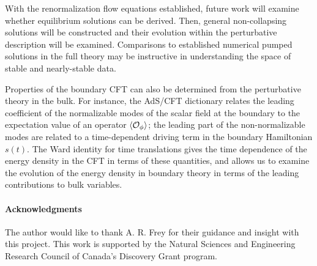 \documentclass[../PhD.tex]{subfiles}
\begin{document}
With the renormalization flow equations established, future work will examine whether equilibrium solutions can be derived. Then, general non-collapsing solutions will be constructed and their evolution within the perturbative description will be examined. Comparisons to established numerical pumped solutions in the full theory may be instructive in understanding the space of stable and nearly-stable data.  

Properties of the boundary CFT can also be determined from the perturbative theory in the bulk. For instance, the AdS/CFT dictionary relates the leading coefficient of the normalizable modes of the scalar field at the boundary to the expectation value of an operator $\langle \mathcal O_\phi \rangle$; the leading part of the non-normalizable modes are related to a time-dependent driving term in the boundary Hamiltonian $s(t)$. The Ward identity for time translations gives the time dependence of the energy density in the CFT in terms of these quantities, and allows us to examine the evolution of the energy density in boundary theory in terms of the leading contributions to bulk variables.


\paragraph*{Acknowledgments} The author would like to thank A. R. Frey for their guidance and insight with this project. This work is supported by the Natural Sciences and Engineering Research Council of Canada's Discovery Grant program.

\end{document}
